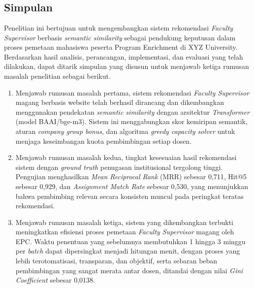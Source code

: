 \chapter{\babLima}

\section{Simpulan}

Penelitian ini bertujuan untuk mengembangkan sistem rekomendasi \textit{Faculty Supervisor} berbasis \textit{semantic similarity} sebagai pendukung keputusan dalam proses pemetaan mahasiswa peserta Program Enrichment di XYZ University. Berdasarkan hasil analisis, perancangan, implementasi, dan evaluasi yang telah dilakukan, dapat ditarik simpulan yang disusun untuk menjawab ketiga rumusan masalah penelitian sebagai berikut.

\begin{enumerate}
    \item Menjawab rumusan masalah pertama, sistem rekomendasi \textit{Faculty Supervisor} magang berbasis website telah berhasil dirancang dan dikembangkan menggunakan pendekatan \textit{semantic similarity} dengan arsitektur \textit{Transformer} (model BAAI/bge-m3). Sistem ini menggabungkan skor kemiripan semantik, aturan \textit{company group bonus}, dan algoritma \textit{greedy capacity solver} untuk menjaga keseimbangan kuota pembimbingan setiap dosen.

    \item Menjawab rumusan masalah kedua, tingkat kesesuaian hasil rekomendasi sistem dengan \textit{ground truth} penugasan institusional tergolong tinggi. Pengujian menghasilkan \textit{Mean Reciprocal Rank} (MRR) sebesar 0,711, Hit@5 sebesar 0,929, dan \textit{Assignment Match Rate} sebesar 0,530, yang menunjukkan bahwa pembimbing relevan secara konsisten muncul pada peringkat teratas rekomendasi.

    \item Menjawab rumusan masalah ketiga, sistem yang dikembangkan terbukti meningkatkan efisiensi proses pemetaan \textit{Faculty Supervisor} magang oleh EPC. Waktu penentuan yang sebelumnya membutuhkan 1 hingga 3 minggu per \textit{batch} dapat dipersingkat menjadi hitungan menit, dengan proses yang lebih terotomatisasi, transparan, dan objektif, serta sebaran beban pembimbingan yang sangat merata antar dosen, ditandai dengan nilai \textit{Gini Coefficient} sebesar 0,0138.

\end{enumerate}

